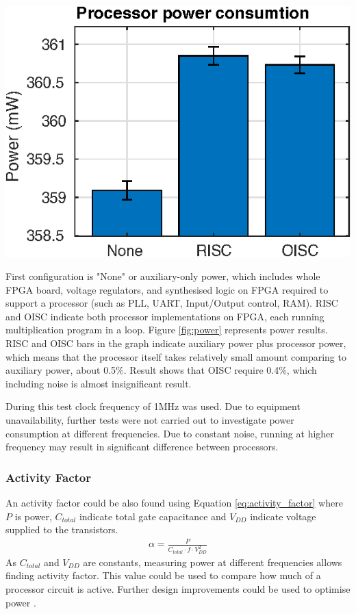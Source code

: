 \begin{colfigure}
	\centering
	\includegraphics[width=\linewidth]{../tests/power.eps}
	\label{fig:power}
\end{colfigure}

First configuration is "None" or auxiliary-only power, which includes whole FPGA board, voltage regulators, and synthesised logic on FPGA required to support a processor (such as PLL, UART, Input/Output control, RAM). RISC and OISC indicate both processor implementations on FPGA, each running multiplication program in a loop. Figure \ref{fig:power} represents power results. RISC and OISC bars in the graph indicate auxiliary power plus processor power, which means that the processor itself takes relatively small amount comparing to auxiliary power, about 0.5\%. Result shows that OISC require 0.4\%, which including noise is almost insignificant result.

During this test clock frequency of 1MHz was used. Due to equipment unavailability, further tests were not carried out to investigate power consumption at different frequencies. Due to constant noise, running at higher frequency may result in significant difference between processors.

\subsubsection{Activity Factor}
An activity factor could be also found using Equation \ref{eq:activity_factor} where $P$ is power, $C_{total}$ indicate total gate capacitance and $V_{DD}$ indicate voltage supplied to the transistors.
\begin{align}\label{eq:activity_factor}
\alpha = \frac{P}{C_{total}\cdot f \cdot V_{DD}^2}
\end{align}
As $C_{total}$ and $V_{DD}$ are constants, measuring power at different frequencies allows finding activity factor. This value could be used to compare how much of a processor circuit is active. Further design improvements could be used to optimise power \autocite{8682289,7363689,1207041,6972455}.



